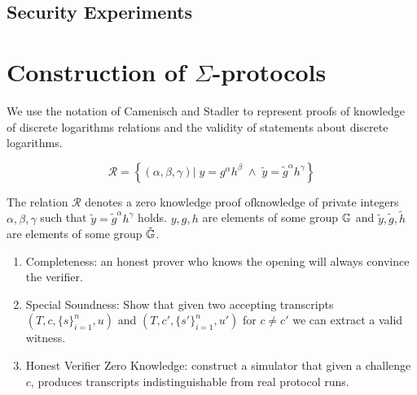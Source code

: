 \subsection{Security Experiments}





\newpage






\section{Construction of $\Sigma$-protocols}\label{sec:sigmaproofs}

We use the notation of Camenisch and Stadler to represent proofs of knowledge of discrete logarithms relations and the validity of statements about discrete logarithms. 

\[
    \mathcal{R} = \left\{ (\alpha, \beta, \gamma) | \; y = g^{\alpha}h^{\beta} \; \wedge \; \tilde{y} = \tilde{g}^{\alpha}h^{\gamma} \right\}
\]

The relation $\mathcal{R}$ denotes a zero knowledge proof ofknowledge of private integers $\alpha, \beta, \gamma$ such that $\tilde{y} = \tilde{g}^{\alpha}h^{\gamma}$ holds. $y, g, h$ are elements of some group $\mathbb{G}$ and $\tilde{y}, \tilde{g}, \tilde{h}$ are elements of some group $\tilde{\mathbb{G}}$. 





\begin{enumerate}
    \item Completeness: an honest prover who knows the opening will always convince the verifier.
    
    \item Special Soundness: Show that given two accepting transcripts $(T, c, \{s\}_{i=1}^n, u)$ and $(T, c', \{s'\}_{i=1}^n, u')$ for $c \neq c'$ we can extract a valid witness.
    
    \item Honest Verifier Zero Knowledge: construct a simulator that given a challenge $c$, produces transcripts indistinguishable from real protocol runs.
\end{enumerate}










